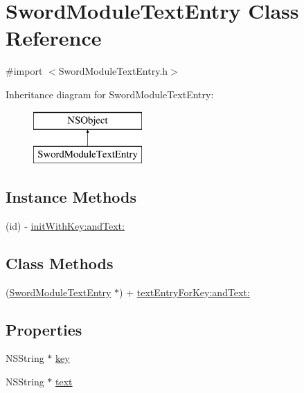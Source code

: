 \hypertarget{interface_sword_module_text_entry}{\section{Sword\-Module\-Text\-Entry Class Reference}
\label{interface_sword_module_text_entry}
}


{\ttfamily \#import $<$Sword\-Module\-Text\-Entry.\-h$>$}

Inheritance diagram for Sword\-Module\-Text\-Entry\-:\begin{figure}[H]
\begin{center}
\leavevmode
\includegraphics[height=2.000000cm]{interface_sword_module_text_entry}
\end{center}
\end{figure}
\subsection*{Instance Methods}
\begin{DoxyCompactItemize}
\item 
(id) -\/ \hyperlink{interface_sword_module_text_entry_a57b67eb67848fb7bf58068bf5c92d343}{init\-With\-Key\-:and\-Text\-:}
\end{DoxyCompactItemize}
\subsection*{Class Methods}
\begin{DoxyCompactItemize}
\item 
(\hyperlink{interface_sword_module_text_entry}{Sword\-Module\-Text\-Entry} $\ast$) + \hyperlink{interface_sword_module_text_entry_a2f712a3e7907b4be18ed9216917777b4}{text\-Entry\-For\-Key\-:and\-Text\-:}
\end{DoxyCompactItemize}
\subsection*{Properties}
\begin{DoxyCompactItemize}
\item 
N\-S\-String $\ast$ \hyperlink{interface_sword_module_text_entry_a10a0815bfcf8afc08291f09bb4a0c086}{key}
\item 
N\-S\-String $\ast$ \hyperlink{interface_sword_module_text_entry_af2db62cd230bc0a10cea4e7630ac9e07}{text}
\end{DoxyCompactItemize}


